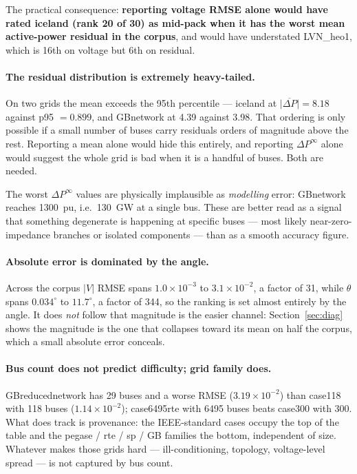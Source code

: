 \documentclass[10pt]{article}
\begin{document}
The practical consequence: \textbf{reporting voltage RMSE alone would have rated
iceland (rank 20 of 30) as mid-pack when it has the worst mean active-power
residual in the corpus}, and would have understated LVN\_heo1, which is 16th on
voltage but 6th on residual.

\paragraph{The residual distribution is extremely heavy-tailed.} On two grids
the mean exceeds the 95th percentile --- iceland at
$\overline{|\Delta P|}=8.18$ against p95 $=0.899$, and GBnetwork at 4.39 against
3.98. That ordering is only possible if a small number of buses carry residuals
orders of magnitude above the rest. Reporting a mean alone would hide this
entirely, and reporting $\Delta P^{\infty}$ alone would suggest the whole grid is
bad when it is a handful of buses. Both are needed.

The worst $\Delta P^{\infty}$ values are physically implausible as
\emph{modelling} error: GBnetwork reaches 1300~pu, i.e.\ 130~GW at a single bus.
These are better read as a signal that something degenerate is happening at
specific buses --- most likely near-zero-impedance branches or isolated
components --- than as a smooth accuracy figure.

\paragraph{Absolute error is dominated by the angle.} Across the corpus
$|V|$ RMSE spans $1.0\times10^{-3}$ to $3.1\times10^{-2}$, a factor of 31, while
$\theta$ spans $0.034^\circ$ to $11.7^\circ$, a factor of 344, so the ranking is
set almost entirely by the angle. It does \emph{not} follow that magnitude is
the easier channel: Section~\ref{sec:diag} shows the magnitude is the one that
collapses toward its mean on half the corpus, which a small absolute error
conceals.

\paragraph{Bus count does not predict difficulty; grid family does.}
GBreducednetwork has 29 buses and a worse RMSE ($3.19\times10^{-2}$) than
case118 with 118 buses ($1.14\times10^{-2}$); case6495rte with 6495 buses beats
case300 with 300. What does track is provenance: the IEEE-standard cases occupy
the top of the table and the pegase / rte / sp / GB families the bottom,
independent of size. Whatever makes those grids hard --- ill-conditioning,
topology, voltage-level spread --- is not captured by bus count.
\end{document}
